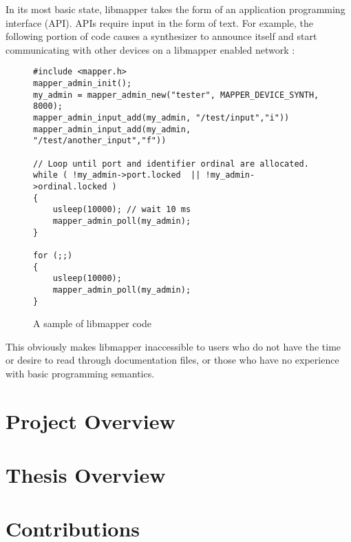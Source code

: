 In its most basic state, libmapper takes the form of an application programming interface (API). APIs require input in the form of text. For example, the following portion of code causes a synthesizer to announce itself and start communicating with other devices on a libmapper enabled network :

\begin{figure}[h!]
\begin{lstlisting}[]
#include <mapper.h>
mapper_admin_init();
my_admin = mapper_admin_new("tester", MAPPER_DEVICE_SYNTH, 8000); 
mapper_admin_input_add(my_admin, "/test/input","i")) 
mapper_admin_input_add(my_admin, "/test/another_input","f"))

// Loop until port and identifier ordinal are allocated. 
while ( !my_admin->port.locked	|| !my_admin->ordinal.locked )
{
	usleep(10000); // wait 10 ms 
	mapper_admin_poll(my_admin);
}

for (;;) 
{
	usleep(10000);
	mapper_admin_poll(my_admin); 
}
\end{lstlisting}
\caption{A sample of libmapper code}
\end{figure}

This obviously makes libmapper inaccessible to users who do not have the time or desire to read through documentation files, or those who have no experience with basic programming semantics. 



\section{Project Overview}

\section{Thesis Overview}

\section{Contributions}